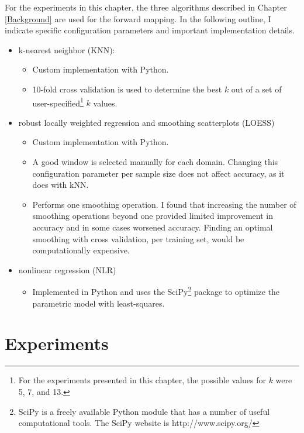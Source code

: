 For the experiments in this chapter, the three algorithms described in Chapter \ref{Background} are used for the forward mapping. In the following outline, I indicate specific configuration parameters and important implementation details.
\begin{itemize}
 \item k-nearest neighbor (KNN):
  \begin{itemize}
   \item Custom implementation with Python.
   \item 10-fold cross validation is used to determine the best $k$ out of a set of user-specified\footnote{For the experiments presented in this chapter, the possible values for $k$ were 5, 7, and 13.} $k$ values.
  \end{itemize}

 \item robust locally weighted regression and smoothing scatterplots (LOESS)
  \begin{itemize}
   \item Custom implementation with Python.
   \item A good window is selected manually for each domain. Changing this configuration parameter per sample size does not affect accuracy, as it does with kNN.
   \item Performs one smoothing operation. I found that increasing the number of smoothing operations beyond one provided limited improvement in accuracy and in some cases worsened accuracy. Finding an optimal smoothing with cross validation, per training set, would be computationally expensive.
  \end{itemize}

 \item nonlinear regression (NLR)
   \begin{itemize}
      \item Implemented in Python and uses the SciPy\footnote{SciPy is a freely available Python module that has a number of useful computational tools. The SciPy website is http://www.scipy.org/} package to optimize the parametric model with least-squares.
   \end{itemize}

\end{itemize}


\section{Experiments}\label{sec:exps}

